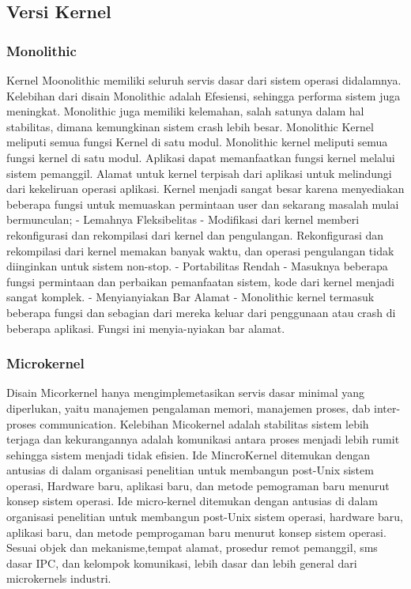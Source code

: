 \subsection{Versi Kernel}
\subsubsection{Monolithic}
 Kernel Moonolithic memiliki seluruh servis dasar dari sistem operasi didalamnya. Kelebihan dari disain Monolithic adalah Efesiensi, sehingga performa sistem juga
 meningkat. Monolithic juga memiliki kelemahan, salah satunya dalam hal stabilitas, dimana kemungkinan sistem crash lebih besar. Monolithic Kernel meliputi semua 
 fungsi Kernel di satu modul. Monolithic kernel meliputi semua fungsi kernel di satu modul. Aplikasi dapat memanfaatkan fungsi kernel melalui sistem pemanggil. Alamat untuk kernel terpisah dari aplikasi untuk melindungi dari kekeliruan operasi aplikasi. Kernel menjadi sangat besar karena menyediakan beberapa fungsi untuk memuaskan permintaan user dan sekarang masalah mulai bermunculan;
 - Lemahnya Fleksibelitas
 - Modifikasi dari kernel memberi rekonfigurasi dan rekompilasi dari kernel dan pengulangan. Rekonfigurasi dan rekompilasi dari kernel memakan banyak waktu, dan operasi pengulangan tidak diinginkan untuk sistem non-stop.  
 - Portabilitas Rendah
 - Masuknya beberapa fungsi permintaan dan perbaikan pemanfaatan sistem, kode dari kernel menjadi sangat komplek.
 - Menyianyiakan Bar Alamat
 - Monolithic kernel termasuk beberapa fungsi dan sebagian dari mereka keluar dari penggunaan atau crash di beberapa aplikasi. Fungsi ini menyia-nyiakan bar alamat.
	
\subsubsection{Microkernel}
 Disain Micorkernel hanya mengimplemetasikan servis dasar minimal yang diperlukan, yaitu manajemen pengalaman memori, manajemen proses, dab inter-proses communication.
 Kelebihan Micokernel adalah stabilitas sistem lebih terjaga dan kekurangannya adalah komunikasi antara proses menjadi lebih rumit sehingga sistem menjadi tidak efisien.
 Ide MincroKernel ditemukan dengan antusias di dalam organisasi penelitian untuk membangun post-Unix sistem operasi, Hardware baru, aplikasi baru, dan metode pemograman baru
 menurut konsep sistem operasi. Ide micro-kernel ditemukan  dengan antusias di dalam organisasi penelitian untuk membangun post-Unix sistem operasi, hardware baru, aplikasi baru,
 dan metode pemprogaman baru menurut konsep sistem operasi. Sesuai objek dan mekanisme,tempat alamat, prosedur remot pemanggil, sms dasar IPC, dan kelompok komunikasi, lebih dasar dan lebih general dari microkernels industri.
	
